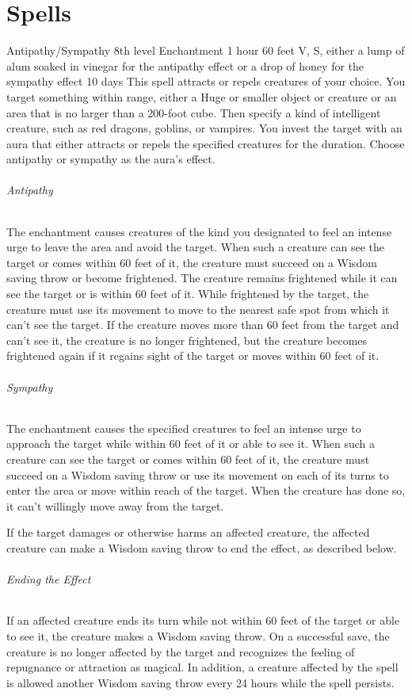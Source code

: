 \documentclass[10pt,a4paper,twoside,bg=print,twocolumn,openany,nodeprecatedcode]{dndbook}
\begin{document}
\chapter{Spells}


\DndSpellHeader%
{Antipathy/Sympathy}
{8th level Enchantment}
{1 hour}
{60 feet}
{V, S, either a lump of alum soaked in vinegar for the antipathy effect or a drop of honey for the sympathy effect}
{10 days}
This spell attracts or repels creatures of your choice. You target something within range, either a Huge or smaller object or creature or an area that is no larger than a 200-foot cube. Then specify a kind of intelligent creature, such as red dragons, goblins, or vampires. You invest the target with an aura that either attracts or repels the specified creatures for the duration. Choose antipathy or sympathy as the aura's effect.

\subparagraph{Antipathy}
The enchantment causes creatures of the kind you designated to feel an intense urge to leave the area and avoid the target. When such a creature can see the target or comes within 60 feet of it, the creature must succeed on a Wisdom saving throw or become frightened. The creature remains frightened while it can see the target or is within 60 feet of it. While frightened by the target, the creature must use its movement to move to the nearest safe spot from which it can't see the target. If the creature moves more than 60 feet from the target and can't see it, the creature is no longer frightened, but the creature becomes frightened again if it regains sight of the target or moves within 60 feet of it.

\subparagraph{Sympathy}
The enchantment causes the specified creatures to feel an intense urge to approach the target while within 60 feet of it or able to see it. When such a creature can see the target or comes within 60 feet of it, the creature must succeed on a Wisdom saving throw or use its movement on each of its turns to enter the area or move within reach of the target. When the creature has done so, it can't willingly move away from the target.

If the target damages or otherwise harms an affected creature, the affected creature can make a Wisdom saving throw to end the effect, as described below.

\subparagraph{Ending the Effect}
If an affected creature ends its turn while not within 60 feet of the target or able to see it, the creature makes a Wisdom saving throw. On a successful save, the creature is no longer affected by the target and recognizes the feeling of repugnance or attraction as magical. In addition, a creature affected by the spell is allowed another Wisdom saving throw every 24 hours while the spell persists.
\end{document}
